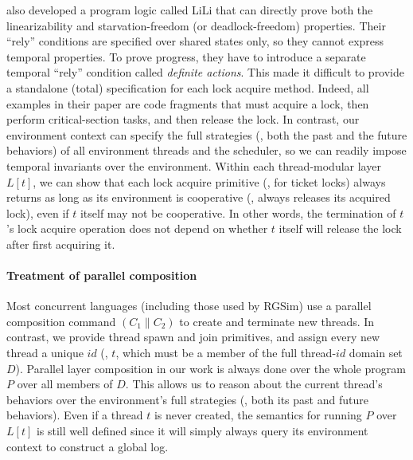 \citet{lili16} also developed a program logic called LiLi that can
directly prove both the linearizability and starvation-freedom (or
deadlock-freedom) properties. Their ``rely'' conditions are specified
over shared states only, so they cannot express temporal properties. To
prove progress, they have to introduce a separate temporal ``rely''
condition called {\em definite actions}.  This made it difficult to
provide a standalone (total) specification for each lock acquire
method.  Indeed, all examples in their paper are code fragments that
must acquire a lock, then perform critical-section tasks, and then release the
lock. In contrast, our environment context can specify the full
strategies (\ie, both the past and the future behaviors) of all
environment threads and the scheduler, so we can readily impose
temporal invariants over the environment. Within each thread-modular
layer $L[t]$, we can show that each lock acquire primitive (\eg, for
ticket locks) always returns as long as its environment is cooperative
(\eg, always releases its acquired lock), even if $t$ itself may not
be cooperative.
In other words, the termination of $t$'s lock acquire
operation does not depend on whether $t$ itself will release the lock
after first acquiring it.


\paragraph{Treatment of parallel composition}
Most concurrent languages (including those used by RGSim) use a
parallel composition command $(C_1 \| C_2)$ to create and terminate
new threads.  In contrast, we provide thread spawn and join
primitives, and assign every new thread a unique $id$ (\eg, $t$, which
must be a member of the full thread-$id$  domain set $D$). Parallel layer
composition in our work is always done over the whole program $P$ over
all members of $D$. This allows us to reason about the current
thread's behaviors over the environment's full strategies (\ie, both
its past and future behaviors). Even if a thread $t$ is never
created, the semantics for running $P$ over $L[t]$ is still well
defined since it will simply always query its environment context to
construct a global log.

